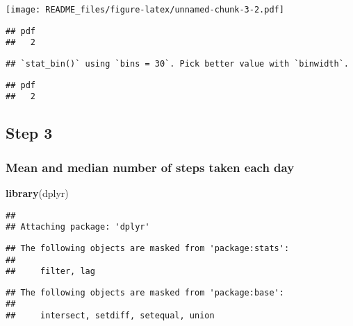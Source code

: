 \documentclass[
]{article}
\newenvironment{Shaded}{\begin{snugshade}}{\end{snugshade}}
\newcommand{\DataTypeTok}[1]{\textcolor[rgb]{0.13,0.29,0.53}{#1}}
\newcommand{\DecValTok}[1]{\textcolor[rgb]{0.00,0.00,0.81}{#1}}
\newcommand{\KeywordTok}[1]{\textcolor[rgb]{0.13,0.29,0.53}{\textbf{#1}}}
\newcommand{\NormalTok}[1]{#1}
\newcommand{\OperatorTok}[1]{\textcolor[rgb]{0.81,0.36,0.00}{\textbf{#1}}}
\newcommand{\OtherTok}[1]{\textcolor[rgb]{0.56,0.35,0.01}{#1}}
\newcommand{\StringTok}[1]{\textcolor[rgb]{0.31,0.60,0.02}{#1}}
\begin{document}
\texttt{[image: README\_files/figure-latex/unnamed-chunk-3-2.pdf]}

\begin{verbatim}
## pdf 
##   2
\end{verbatim}

\begin{verbatim}
## `stat_bin()` using `bins = 30`. Pick better value with `binwidth`.
\end{verbatim}

\begin{verbatim}
## pdf 
##   2
\end{verbatim}

\hypertarget{step-3}{%
\subsection{Step 3}\label{step-3}}

\hypertarget{mean-and-median-number-of-steps-taken-each-day}{%
\subsubsection{Mean and median number of steps taken each
day}\label{mean-and-median-number-of-steps-taken-each-day}}

\begin{Shaded}
\begin{Highlighting}[]
\KeywordTok{library}\NormalTok{(dplyr)}
\end{Highlighting}
\end{Shaded}

\begin{verbatim}
## 
## Attaching package: 'dplyr'
\end{verbatim}

\begin{verbatim}
## The following objects are masked from 'package:stats':
## 
##     filter, lag
\end{verbatim}

\begin{verbatim}
## The following objects are masked from 'package:base':
## 
##     intersect, setdiff, setequal, union
\end{verbatim}

\begin{Shaded}
\end{Shaded}
\end{document}
